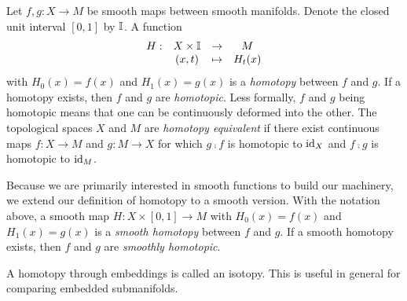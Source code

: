 \begin{defn}[Homotopy]
	\label{def:homotopy}
	Let $f,g:X\to M$ be smooth maps between smooth manifolds.
	Denote the closed unit interval $[0,1]$ by $\mathbb{I}$.
	A function 
	\[
		\begin{array}{cccc}
			H: & X\times \mathbb{I} & \to & M \\
			   & (x,t)	& \mapsto & H_t(x)
		\end{array}
	\]
	with $H_0(x)=f(x)$ and $H_1(x)=g(x)$ is a \emph{homotopy} between $f$ and $g$.
	If a homotopy exists, then $f$ and $g$ are \emph{homotopic}.
	Less formally, $f$ and $g$ being homotopic means that one can be continuously deformed into the other.
	The topological spaces $X$ and $M$ are \emph{homotopy equivalent} if there exist continuous maps $f:X\to M$ and $g:M\to X$ for which $g\comp f$ is homotopic to $\textrm{id}_{X}$ and $f\comp g$ is homotopic to $\textrm{id}_{M}$.
	
	Because we are primarily interested in smooth functions to build our machinery, we extend our definition of homotopy to a smooth version.
	With the notation above, a smooth map $H:X\times[0,1]\to M$ with $H_0(x)=f(x)$ and $H_1(x)=g(x)$ is a \emph{smooth homotopy} between $f$ and $g$.
	If a smooth homotopy exists, then $f$ and $g$ are \emph{smoothly homotopic}.
\end{defn}

A homotopy through embeddings is called an isotopy.
This is useful in general for comparing embedded submanifolds.

